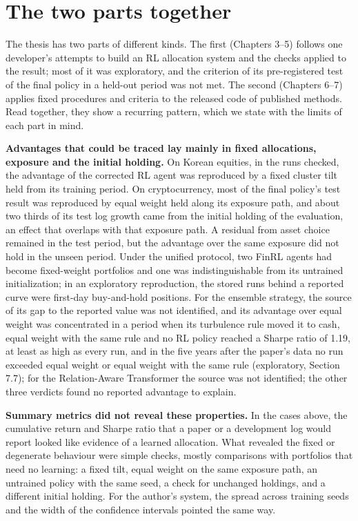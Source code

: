 \documentclass[12pt,a4paper]{report}
\begin{document}
\section{The two parts together}\label{the-two-parts-together}

The thesis has two parts of different kinds. The first (Chapters 3--5)
follows one developer's attempts to build an RL allocation system and
the checks applied to the result; most of it was exploratory, and the
criterion of its pre-registered test of the final policy in a held-out
period was not met. The second (Chapters 6--7) applies fixed procedures
and criteria to the released code of published methods. Read together,
they show a recurring pattern, which we state with the limits of each
part in mind.

\textbf{Advantages that could be traced lay mainly in fixed allocations,
exposure and the initial holding.} On Korean equities, in the runs
checked, the advantage of the corrected RL agent was reproduced by a
fixed cluster tilt held from its training period. On cryptocurrency,
most of the final policy's test result was reproduced by equal weight
held along its exposure path, and about two thirds of its test log
growth came from the initial holding of the evaluation, an effect that
overlaps with that exposure path. A residual from asset choice remained
in the test period, but the advantage over the same exposure did not
hold in the unseen period. Under the unified protocol, two FinRL agents
had become fixed-weight portfolios and one was indistinguishable from
its untrained initialization; in an exploratory reproduction, the stored
runs behind a reported curve were first-day buy-and-hold positions. For
the ensemble strategy, the source of its gap to the reported value was
not identified, and its advantage over equal weight was concentrated in
a period when its turbulence rule moved it to cash, equal weight with
the same rule and no RL policy reached a Sharpe ratio of 1.19, at least
as high as every run, and in the five years after the paper's data no
run exceeded equal weight or equal weight with the same rule
(exploratory, Section 7.7); for the Relation-Aware Transformer the
source was not identified; the other three verdicts found no reported
advantage to explain.

\textbf{Summary metrics did not reveal these properties.} In the cases
above, the cumulative return and Sharpe ratio that a paper or a
development log would report looked like evidence of a learned
allocation. What revealed the fixed or degenerate behaviour were simple
checks, mostly comparisons with portfolios that need no learning: a
fixed tilt, equal weight on the same exposure path, an untrained policy
with the same seed, a check for unchanged holdings, and a different
initial holding. For the author's system, the spread across training
seeds and the width of the confidence intervals pointed the same way.
\end{document}

